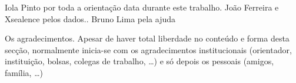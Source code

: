\acknowledgements

Iola Pinto por toda a orientação data durante este trabalho.
João Ferreira e Xsealence pelos dados..
Bruno Lima pela ajuda 

Os agradecimentos. Apesar de haver total liberdade no conteúdo e forma desta secção, normalmente inicia-se com os agradecimentos institucionais (orientador, instituição, bolsas, colegas de trabalho, \ldots) e só depois os pessoais (amigos, família, \ldots)
